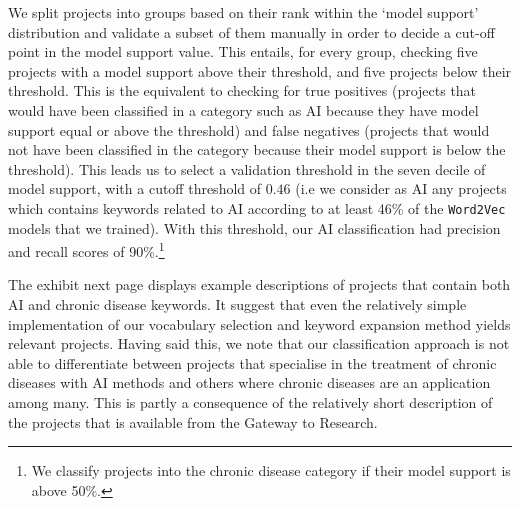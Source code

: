 \documentclass[11pt]{article}
\begin{document}
We split projects into groups based on their rank within the `model support' distribution and validate a subset of them manually in order to decide a cut-off point in the model support value. This entails, for every group, checking five projects with a model support above their threshold, and five projects below their threshold. This is the equivalent to checking for true positives (projects that would have been classified in a category such as AI because they have model support equal or above the threshold) and false negatives (projects that would not have been classified in the category because their model support is below the threshold). This leads us to select a validation threshold in the seven decile of model support, with a cutoff threshold of $0.46$ (i.e we consider as AI any projects which contains keywords related to AI according to at least 46\% of the \texttt{Word2Vec} models that we trained). With this threshold, our AI classification had precision and recall scores of 90\%.\footnote{We classify projects into the chronic disease category if their model support is above 50\%.}

The exhibit next page displays example descriptions of projects that contain both AI and chronic disease keywords. It suggest that even the relatively simple implementation of our vocabulary selection and keyword expansion method yields relevant projects. Having said this, we note that our classification approach is not able to differentiate between projects that specialise in the treatment of chronic diseases with AI methods and others where chronic diseases are an application among many. This is partly a consequence of the relatively short description of the projects that is available from the Gateway to Research. 
\end{document}
